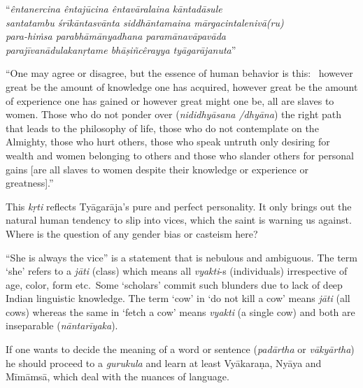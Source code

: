 \begin{enumerate}
\begin{longquote}
“\textit{êntanercina êntajūcina êntavāralaina kāntadāsule}\\ \textit{santatambu śrīkāntasvānta siddhāntamaina mārgacintalenivā(ru)}\\ \textit{para-hiṁsa parabhāmānyadhana paramānavāpavāda} \\ \textit{parajīvanādulakanṛtame bhāṣiñcêrayya tyāgarājanuta}”
\end{longquote}

 “One may agree or disagree, but the essence of human behavior is this:  however great be the amount of knowledge one has acquired, however great be the amount of experience one has gained or however great might one be, all are slaves to women. Those who do not ponder over (\textit{nididhyāsana /dhyāna}) the right path that leads to the philosophy of life, those who do not contemplate on the Almighty, those who hurt others, those who speak untruth only desiring for wealth and women belonging to others and those who slander others for personal gains [are all slaves to women despite their knowledge or experience or greatness].”

 This \textit{kṛti} reflects Tyāgarāja’s pure and perfect personality. It only brings out the natural human tendency to slip into vices, which the saint is warning us against. Where is the question of any gender bias or casteism here?

\end{enumerate}

\vspace{-.25cm}


“She is always the vice” is a statement that is nebulous and ambiguous. The term ‘she’ refers to a \textit{jāti} (class) which means all \textit{vyakti}-s (individuals) irrespective of age, color, form etc.~Some ‘scholars’ commit such blunders due to lack of deep Indian linguistic knowledge. The term ‘cow’ in ‘do not kill a cow’ means \textit{jāti} (all cows) whereas the same in ‘fetch a cow’ means \textit{vyakti} (a single cow) and both are inseparable (\textit{nāntarīyaka}). 

If one wants to decide the meaning of a word or sentence (\textit{padārtha} or \textit{vākyārtha}) he should proceed to a \textit{gurukula} and learn at least Vyākaraṇa, Nyāya and Mīmāmsā, which deal with the nuances of language. 

